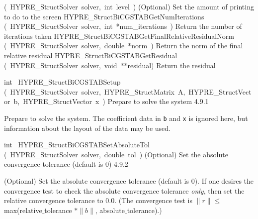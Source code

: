 \documentclass{article}
\begin{document}
\begin{cxxentry}
\begin{cxxentry}
\begin{cxxnames}
        {(\ HYPRE\_StructSolver\ solver,\ int\ level\ )}
        {
(Optional) Set the amount of printing to do to the screen}
        {}
\label{cxx.4.9.10}
        {HYPRE\_StructBiCGSTABGetNumIterations}
        {(\ HYPRE\_StructSolver\ solver,\ int\ *num\_iterations\ )}
        {
Return the number of iterations taken}
        {}
\label{cxx.4.9.11}
        {HYPRE\_StructBiCGSTABGetFinalRelativeResidualNorm}
        {(\ HYPRE\_StructSolver\ solver,\ double\ *norm\ )}
        {
Return the norm of the final relative residual}
        {}
\label{cxx.4.9.12}
        {HYPRE\_StructBiCGSTABGetResidual}
        {(\ HYPRE\_StructSolver\ solver,\ void\ **residual)}
        {
Return the residual}
        {}
\label{cxx.4.9.13}
\end{cxxnames}
\begin{cxxfunction}
{int\ }
        {HYPRE\_StructBiCGSTABSetup}
        {(\ HYPRE\_StructSolver\ solver,\ HYPRE\_StructMatrix\ A,\ HYPRE\_StructVector\ b,\ HYPRE\_StructVector\ x\ )}
        {
Prepare to solve the system}
        {4.9.1}
\begin{cxxdoc}

Prepare to solve the system.  The coefficient data in {\tt b} and {\tt x} is
ignored here, but information about the layout of the data may be used.
\end{cxxdoc}
\end{cxxfunction}
\begin{cxxfunction}
{int\ }
        {HYPRE\_StructBiCGSTABSetAbsoluteTol}
        {(\ HYPRE\_StructSolver\ solver,\ double\ tol\ )}
        {
(Optional) Set the absolute convergence tolerance (default is 0)}
        {4.9.2}
\begin{cxxdoc}

(Optional) Set the absolute convergence tolerance (default is 0). 
If one desires
the convergence test to check the absolute convergence tolerance {\it only}, then
set the relative convergence tolerance to 0.0.  (The convergence test is 
$\|r\| \leq$ max(relative$\_$tolerance $\ast \|b\|$, absolute$\_$tolerance).)


\end{cxxdoc}
\end{cxxfunction}
\end{cxxentry}
\end{cxxentry}
\end{document}
